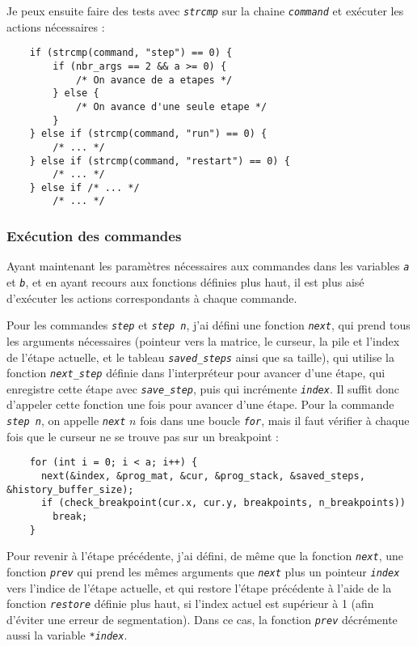 \documentclass[a4paper,11pt]{article}
\newcommand{\code}[1]{{\itshape\lstinline{#1}}}
\begin{document}
Je peux ensuite faire des tests avec \code{strcmp} sur la chaine \code{command} et exécuter les actions nécessaires :
\bigskip

{\small\begin{lstlisting}
    if (strcmp(command, "step") == 0) {
        if (nbr_args == 2 && a >= 0) {
            /* On avance de a etapes */
        } else {
            /* On avance d'une seule etape */
        }
    } else if (strcmp(command, "run") == 0) {
        /* ... */
    } else if (strcmp(command, "restart") == 0) {
        /* ... */
    } else if /* ... */
        /* ... */
\end{lstlisting}}

\subsubsection*{Exécution des commandes}

Ayant maintenant les paramètres nécessaires aux commandes dans les variables \code{a} et \code{b}, et en ayant recours aux fonctions définies plus haut, il est plus aisé d'exécuter les actions correspondants à chaque commande.

\bigskip

Pour les commandes \code{step} et \code{step n}, j'ai défini une fonction \code{next}, qui prend tous les arguments nécessaires (pointeur vers la matrice, le curseur, la pile et l'index de l'étape actuelle, et le tableau \code{saved_steps} ainsi que sa taille), qui utilise la fonction \code{next_step} définie dans l'interpréteur pour avancer d'une étape, qui enregistre cette étape avec \code{save_step}, puis qui incrémente \code{index}.
Il suffit donc d'appeler cette fonction une fois pour avancer d'une étape.
Pour la commande \code{step n}, on appelle \code{next} $n$ fois dans une boucle \code{for}, mais il faut vérifier à chaque fois que le curseur ne se trouve pas sur un breakpoint :

{\small\begin{lstlisting}
    for (int i = 0; i < a; i++) {
      next(&index, &prog_mat, &cur, &prog_stack, &saved_steps, &history_buffer_size);
      if (check_breakpoint(cur.x, cur.y, breakpoints, n_breakpoints))
        break;
    }
\end{lstlisting}}

Pour revenir à l'étape précédente, j'ai défini, de même que la fonction \code{next}, une fonction \code{prev} qui prend les mêmes arguments que \code{next} plus un pointeur \code{index} vers l'indice de l'étape actuelle, et qui restore l'étape précédente à l'aide de la fonction \code{restore} définie plus haut, si l'index actuel est supérieur à 1 (afin d'éviter une erreur de segmentation). Dans ce cas, la fonction \code{prev} décrémente aussi la variable \code{*index}.
\end{document}
